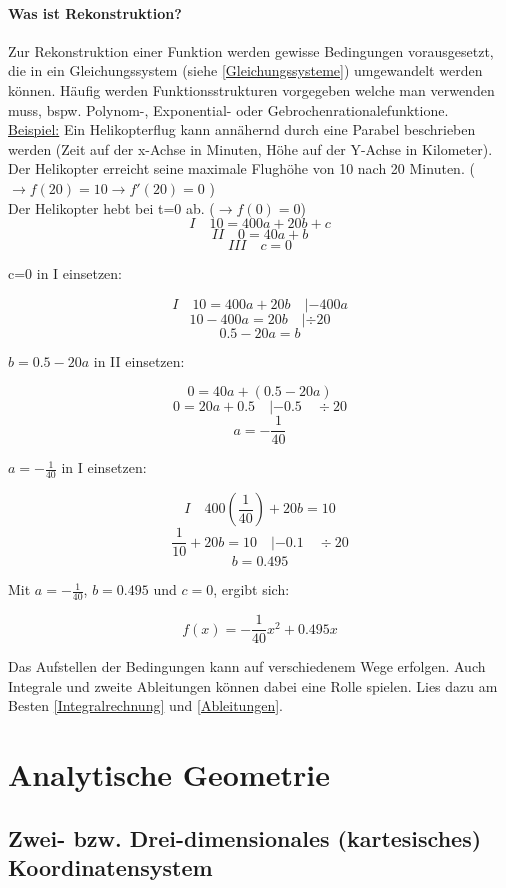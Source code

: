 \documentclass{article}
\begin{document}
		\paragraph{Was ist Rekonstruktion?}
			Zur Rekonstruktion einer Funktion werden gewisse Bedingungen vorausgesetzt, die in ein Gleichungssystem (siehe \ref{Gleichungssysteme}) umgewandelt werden können. Häufig werden Funktionsstrukturen vorgegeben welche man verwenden muss, bspw. Polynom-, Exponential- oder Gebrochenrationalefunktione. \\
			\underline{Beispiel:} Ein Helikopterflug kann annähernd durch eine Parabel beschrieben werden (Zeit auf der x-Achse in Minuten, Höhe auf der Y-Achse in Kilometer). \\
			Der Helikopter erreicht seine maximale Flughöhe von 10 nach 20 Minuten. ( $ \rightarrow f(20)=10 \rightarrow f'(20)=0 $ ) \\
			Der Helikopter hebt bei t=0 ab. ($ \rightarrow f(0)=0$) \\
			
			\[ I \quad 10=400a+20b+c \]
			\[ II \quad 0=40a+b \]
			\[ III \quad c=0 \]
			
			c=0 in I einsetzen:
			
			\[I \quad 10=400a+20b \quad |-400a \]
			\[ 10-400a=20b \quad | \div 20\]
			\[ 0.5-20a=b\]
			
			$b= 0.5-20a $ in II einsetzen:
			
			\[ 0=40a+(0.5-20a)\]
			\[ 0=20a+0.5 \quad |-0.5 \quad \div 20\]
			\[ a=-\frac{1}{40} \]
			
			$a=-\frac{1}{40}$ in I einsetzen:
			
			\[ I \quad 400(\frac{1}{40})+20b=10 \]
			\[ \frac{1}{10}+20b=10 \quad |-0.1 \quad \div 20\]
			\[ b=0.495\]
			
			Mit $a=-\frac{1}{40}$, $b=0.495$ und $c=0$, ergibt sich:
			
			\[f(x)=-\frac{1}{40}x^2+0.495x\]
			
			Das Aufstellen der Bedingungen kann auf verschiedenem Wege erfolgen. Auch Integrale und zweite Ableitungen können dabei eine Rolle spielen.
			Lies dazu am Besten \ref{Integralrechnung} und \ref{Ableitungen}.
		
\section{Analytische Geometrie}
	\subsection{Zwei- bzw. Drei-dimensionales (kartesisches) Koordinatensystem}
\end{document}
